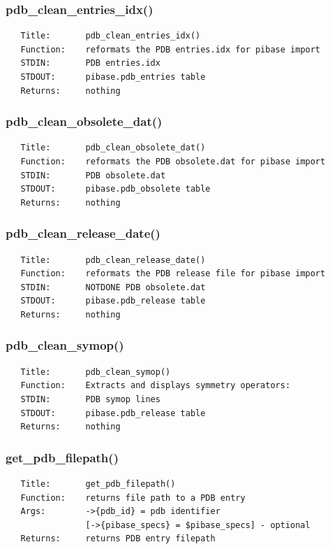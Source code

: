 \documentclass{article}
\begin{document}
\subsubsection*{pdb\_clean\_entries\_idx()\label{pibase::PDB_pdb_clean_entries_idx_}}
\begin{verbatim}
   Title:       pdb_clean_entries_idx()
   Function:    reformats the PDB entries.idx for pibase import
   STDIN:       PDB entries.idx
   STDOUT:      pibase.pdb_entries table
   Returns:     nothing
\end{verbatim}
\subsubsection*{pdb\_clean\_obsolete\_dat()\label{pibase::PDB_pdb_clean_obsolete_dat_}}
\begin{verbatim}
   Title:       pdb_clean_obsolete_dat()
   Function:    reformats the PDB obsolete.dat for pibase import
   STDIN:       PDB obsolete.dat
   STDOUT:      pibase.pdb_obsolete table
   Returns:     nothing
\end{verbatim}
\subsubsection*{pdb\_clean\_release\_date()\label{pibase::PDB_pdb_clean_release_date_}}
\begin{verbatim}
   Title:       pdb_clean_release_date()
   Function:    reformats the PDB release file for pibase import
   STDIN:       NOTDONE PDB obsolete.dat
   STDOUT:      pibase.pdb_release table
   Returns:     nothing
\end{verbatim}
\subsubsection*{pdb\_clean\_symop()\label{pibase::PDB_pdb_clean_symop_}}
\begin{verbatim}
   Title:       pdb_clean_symop()
   Function:    Extracts and displays symmetry operators:
   STDIN:       PDB symop lines
   STDOUT:      pibase.pdb_release table
   Returns:     nothing
\end{verbatim}
\subsubsection*{get\_pdb\_filepath()\label{pibase::PDB_get_pdb_filepath_}}
\begin{verbatim}
   Title:       get_pdb_filepath()
   Function:    returns file path to a PDB entry
   Args:        ->{pdb_id} = pdb identifier
                [->{pibase_specs} = $pibase_specs] - optional
   Returns:     returns PDB entry filepath
\end{verbatim}
\end{document}
